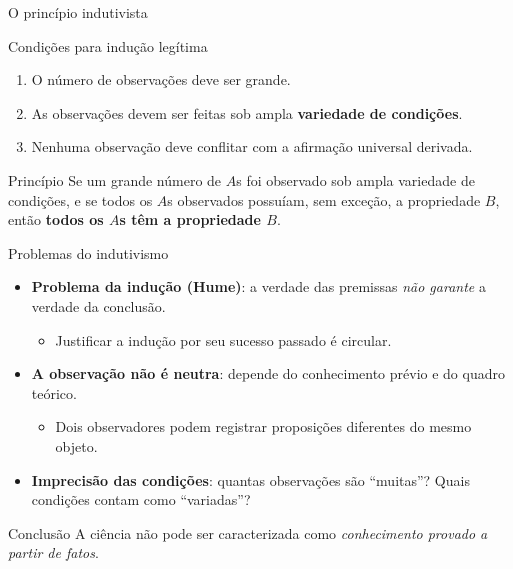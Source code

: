 \documentclass[aspectratio=169]{beamer}
\newcommand{\impt}[1]{\textcolor{maccent}{\textbf{#1}}}
\newcommand{\ntc}[1]{\textcolor{mprimary}{#1}}
\begin{document}
\begin{frame}{O princ\'ipio indutivista}
\begin{alertblock}{Condi\c c\~oes para indu\c c\~ao leg\'itima}
\begin{enumerate}
    \item O n\'umero de observa\c c\~oes deve ser grande.
    \item As observa\c c\~oes devem ser feitas sob ampla \impt{variedade de condi\c c\~oes}.
    \item Nenhuma observa\c c\~ao deve conflitar com a afirma\c c\~ao universal derivada.
\end{enumerate}
\end{alertblock}
\vspace{0.3cm}
\begin{block}{Princ\'ipio}
Se um grande n\'umero de $A$s foi observado sob ampla variedade de condi\c c\~oes, e se todos os $A$s observados possu\'iam, sem exce\c c\~ao, a propriedade $B$, ent\~ao \impt{todos os $A$s t\^em a propriedade $B$}.
\end{block}
\end{frame}

\begin{frame}{Problemas do indutivismo}
\begin{itemize}
    \item \impt{Problema da indu\c c\~ao (Hume)}: a verdade das premissas \emph{n\~ao garante} a verdade da conclus\~ao.
    \begin{itemize}
        \item Justificar a indu\c c\~ao por seu sucesso passado \'e \ntc{circular}.
    \end{itemize}
    \item \impt{A observa\c c\~ao n\~ao \'e neutra}: depende do conhecimento pr\'evio e do quadro te\'orico.
    \begin{itemize}
        \item Dois observadores podem registrar proposi\c c\~oes diferentes do mesmo objeto.
    \end{itemize}
    \item \impt{Imprecis\~ao das condi\c c\~oes}: quantas observa\c c\~oes s\~ao ``muitas''? Quais condi\c c\~oes contam como ``variadas''?
\end{itemize}
\vspace{0.3cm}
\begin{block}{Conclus\~ao}
A ci\^encia n\~ao pode ser caracterizada como \emph{conhecimento provado a partir de fatos}.
\end{block}
\end{frame}
\end{document}
